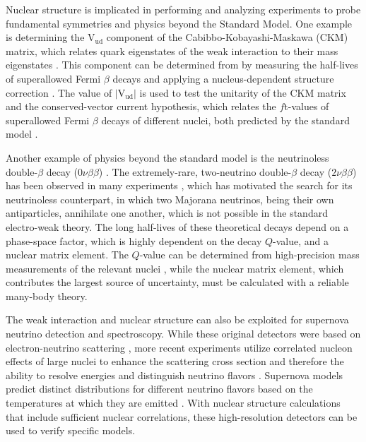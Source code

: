 \documentclass[../thesis.tex]{subfiles}
\begin{document}
Nuclear structure is implicated in performing and analyzing experiments to probe fundamental symmetries and physics beyond the Standard Model. One example is determining the $\mathrm{V_{ud}}$ component of the Cabibbo-Kobayashi-Maskawa (CKM) matrix, which relates quark eigenstates of the weak interaction to their mass eigenstates \cite{CABBIBO1963531,KOBAYASHI1973652}. This component can be determined from by measuring the half-lives of superallowed Fermi $\beta$ decays \cite{TOWNER2003197} and applying a nucleus-dependent structure correction \cite{TOWNER2008025501,TOWNER199413,TOWNER1992478,BARKER1992501,JAUS1990166}. The value of $\left|\mathrm{V_{ud}}\right|$ is used to test the unitarity of the CKM matrix and the conserved-vector current hypothesis, which relates the $f$t-values of superallowed Fermi $\beta$ decays of different nuclei, both predicted by the standard model \cite{HARDY2005055501}.

Another example of physics beyond the standard model is the neutrinoless double-$\beta$ decay ($0\nu\beta\beta$) \cite{SUHONEN1998123,AVIGNONE2008481}. The extremely-rare, two-neutrino double-$\beta$ decay ($2\nu\beta\beta$) has been observed in many experiments \cite{ELLIOTT19872020,MILEY19903092}, which has motivated the search for its neutrinoless counterpart, in which two Majorana neutrinos, being their own antiparticles, annihilate one another, which is not possible in the standard electro-weak theory. The long half-lives of these theoretical decays depend on a phase-space factor, which is highly dependent on the decay $Q$-value, and a nuclear matrix element. The $Q$-value can be determined from high-precision mass measurements of the relevant nuclei \cite{LINCOLN2013012501,GULYUZ2015055501,REDSHAW2012041306,BUSTABAD2013022501}, while the nuclear matrix element, which contributes the largest source of uncertainty, must be calculated with a reliable many-body theory. 

The weak interaction and nuclear structure can also be exploited for supernova neutrino detection and spectroscopy. While these original detectors were based on electron-neutrino scattering \cite{HIRATA19871490,BIONTA19871494}, more recent experiments utilize correlated nucleon effects of large nuclei to enhance the scattering cross section and therefore the ability to resolve energies and distinguish neutrino flavors \cite{HARGROVE1996183,CLINE1994720,EWAN1992373,LANGANKE19962629}. Supernova models predict distinct distributions for different neutrino flavors based on the temperatures at which they are emitted \cite{KOLBE20032569,BENHAR2005053005}. With nuclear structure calculations that include sufficient nuclear correlations, these high-resolution detectors can be used to verify specific models.
\end{document}
